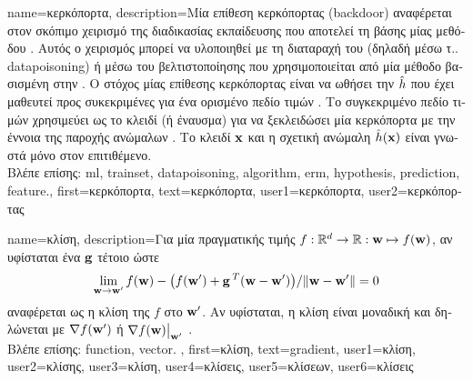 {name={\foreignlanguage{greek}{κερκόπορτα}}, 
	description={\foreignlanguage{greek}{Μία επίθεση κερκόπορτας} 
		(backdoor) \foreignlanguage{greek}{αναφέρεται στον σκόπιμο χειρισμό της διαδικασίας εκπαίδευσης που αποτελεί τη βάσης 
		μίας μεθόδου} . \foreignlanguage{greek}{Αυτός ο χειρισμός μπορεί να υλοποιηθεί με τη διαταραχή του}  
		\foreignlanguage{greek}{(δηλαδή μέσω τ..} \gls{datapoisoning}) \foreignlanguage{greek}{ή μέσω του}  
		 \foreignlanguage{greek}{βελτιστοποίησης που χρησιμοποιείται από μία μέθοδο βασισμένη 
		στην} . \foreignlanguage{greek}{Ο στόχος μίας επίθεσης κερκόπορτας είναι να  
		ωθήσει την}  $\hat{h}$ \foreignlanguage{greek}{που έχει μαθευτεί
		προς συκεκριμένες}  \foreignlanguage{greek}{για ένα ορισμένο πεδίο τιμών} . 
		\foreignlanguage{greek}{Το συγκεκριμένο πεδίο τιμών}  
		\foreignlanguage{greek}{χρησιμεύει ως το κλειδί (ή έναυσμα) για να ξεκλειδώσει μία κερκόπορτα με την έννοια  
		της παροχής ανώμαλων} . \foreignlanguage{greek}{Το κλειδί ${\bf x}$ και η σχετική 
		ανώμαλη}  $\hat{h}({\bf x})$ \foreignlanguage{greek}{είναι γνωστά μόνο στον επιτιθέμενο.}\\
		\foreignlanguage{greek}{Βλέπε επίσης:} \gls{ml}, \gls{trainset}, \gls{datapoisoning}, \gls{algorithm}, \gls{erm}, \gls{hypothesis}, \gls{prediction}, \gls{feature}.},
	first={\foreignlanguage{greek}{κερκόπορτα}},
	text={\foreignlanguage{greek}{κερκόπορτα}},
	user1={\foreignlanguage{greek}{κερκόπορτα}}, %
	user2={\foreignlanguage{greek}{κερκόπορτας}} %
}

{name={\foreignlanguage{greek}{κλίση}},
	description={\foreignlanguage{greek}{Για μία} 
		 \foreignlanguage{greek}{πραγματικής τιμής 
		$f: \mathbb{R}^{d} \rightarrow \mathbb{R}: {\bf w} \mapsto f({\bf w})$, 
		αν υφίσταται ένα}  ${\bf g}$ \foreignlanguage{greek}{τέτοιο ώστε 
		$$\lim_{{\bf w} \rightarrow {\bf w}'} {f({\bf w}) - \big(f({\bf w}') + {\bf g}\,^{T} ({\bf w} - {\bf w}') \big) }/{\| {\bf w} - {\bf w}'\|}=0$$
		αναφέρεται ως η κλίση της $f$ στο ${\bf w}'$. Αν υφίσταται, η κλίση είναι μοναδική και δηλώνεται  
		με $\nabla f({\bf w}')$ ή} $\nabla f({\bf w})\big|_{{\bf w}'}$ \cite{RudinBookPrinciplesMatheAnalysis}.\\
		\foreignlanguage{greek}{Βλέπε επίσης:} \gls{function}, \gls{vector}. },
	first={\foreignlanguage{greek}{κλίση}},
	text={gradient},
	user1={\foreignlanguage{greek}{κλίση}}, %
  	user2={\foreignlanguage{greek}{κλίσης}}, %
	user3={\foreignlanguage{greek}{κλίση}}, %
	user4={\foreignlanguage{greek}{κλίσεις}}, %
  	user5={\foreignlanguage{greek}{κλίσεων}}, %
	user6={\foreignlanguage{greek}{κλίσεις}} %
}

